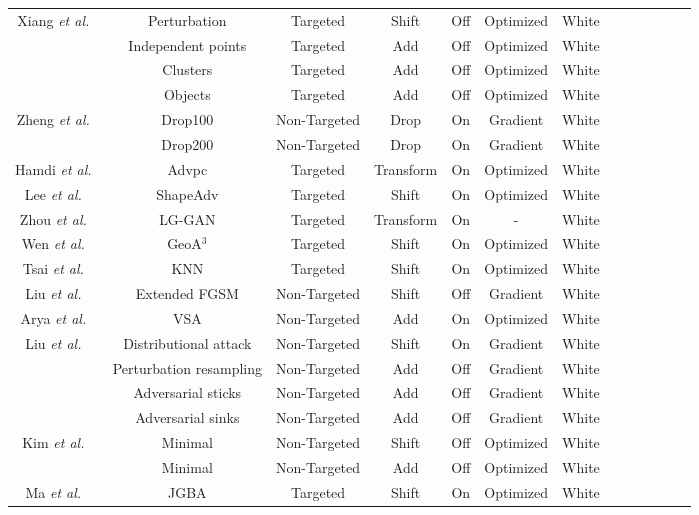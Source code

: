 \documentclass{ieeeaccess}
\def\etal{\textit{et al.}}
\begin{document}
\begin{table*}
\begin{tabular}{c c|ccccccccccc}
\multirow{4}{*}{Xiang \etal~\cite{xiang2019generating}} & Perturbation  & Targeted & Shift & Off & Optimized & White\\& Independent points &Targeted & Add & Off & Optimized & White \\ & Clusters & Targeted & Add & Off &Optimized & White  \\ & Objects & Targeted & Add & Off &Optimized & White  \\
\hline
\multirow{2}{*}{Zheng \etal~\cite{zheng2019pointcloud}} & Drop100  & Non-Targeted & Drop & On& Gradient & White\\  & Drop200 & Non-Targeted & Drop & On& Gradient & White\\
\hline
\multirow{1}{*}{Hamdi \etal~\cite{hamdi2020advpc}} & Advpc & Targeted & Transform & On & Optimized & White\\
\hline
\multirow{1}{*}{Lee \etal~\cite{lee2020shapeadv}} & ShapeAdv & Targeted & Shift & On & Optimized & White\\
\hline
\multirow{1}{*}{Zhou \etal~\cite{zhou2020lg}} & LG-GAN & Targeted & Transform & On & - & White\\
\hline
\multirow{1}{*}{Wen \etal~\cite{wen2020geometry}} & GeoA$^3$ & Targeted & Shift & On & Optimized & White\\
\hline
\multirow{1}{*}{Tsai \etal~\cite{tsai2020robust}} & KNN & Targeted & Shift & On & Optimized & White\\
\hline
\multirow{1}{*}{Liu \etal~\cite{liu2019extending}} & Extended FGSM & Non-Targeted & Shift & Off & Gradient & White\\
\hline
\multirow{1}{*}{Arya \etal~\cite{arya2021adversarial}} & VSA & Non-Targeted & Add & On & Optimized & White\\
\hline
\multirow{4}{*}{Liu \etal~\cite{liu2020adversarial}} & Distributional attack & Non-Targeted & Shift & On & Gradient & White\\ & Perturbation resampling & Non-Targeted & Add & Off & Gradient & White\\ & Adversarial sticks & Non-Targeted & Add & Off & Gradient & White\\ & Adversarial sinks & Non-Targeted & Add & Off & Gradient & White\\
\hline
\multirow{2}{*}{Kim \etal~\cite{kim2021minimal}} & Minimal & Non-Targeted & Shift & Off & Optimized & White\\ & Minimal & Non-Targeted & Add & Off & Optimized & White\\
\hline
\multirow{1}{*}{Ma \etal~\cite{ma2020efficient}} & JGBA & Targeted & Shift & On & Optimized & White\\

\end{tabular}
\end{table*}
\end{document}
